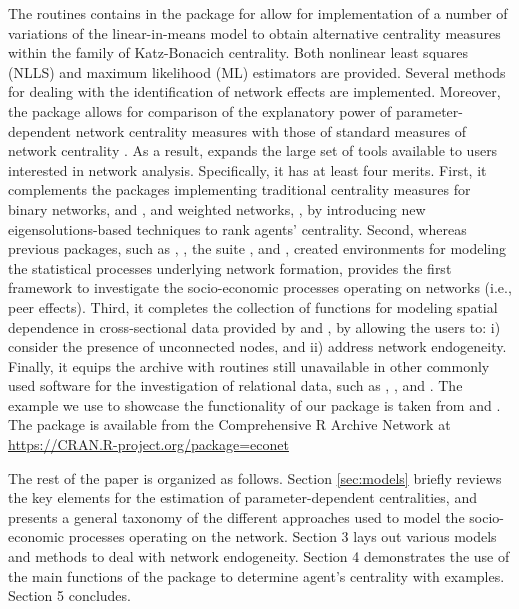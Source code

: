 \documentclass[nojss]{jss}
\begin{document}
	The routines contains in the package  for  \citep{R} allow for implementation of a number of variations of the linear-in-means model to obtain alternative centrality measures within the family of Katz-Bonacich centrality. Both nonlinear least squares (NLLS) and maximum likelihood (ML) estimators are provided. Several methods for dealing with the identification of network effects are implemented. Moreover, the  package allows for comparison of the explanatory power of parameter-dependent network centrality measures with those of standard measures of network centrality \citep{Wasserman+Faust:1994}. As a result,  expands the large set of tools available to  users interested in network analysis. Specifically, it has at least four merits. First, it complements the  packages implementing traditional centrality measures for binary networks,  \citep{igraph} and  \citep{sna}, and weighted networks,  \citep{tnet}, by introducing new eigensolutions-based techniques to rank agents' centrality. Second, whereas previous packages, such as  \citep{btergm},  \citep{hergm}, the  suite \citep{statnet}, and  \citep{xergm}, created environments for modeling the statistical processes underlying network formation,  provides the first framework to investigate the socio-economic processes operating on networks (i.e., peer effects). Third, it completes the collection of functions for modeling spatial dependence in cross-sectional data provided by  \citep{spdep} and  \citep{splm}, by allowing the users to: i) consider the presence of unconnected nodes, and ii) address network endogeneity. Finally, it equips the  archive with routines still unavailable in other commonly used software for the investigation of relational data, such as  \citep{MATLAB},  \citep{Batagelj:2003},  \citep{Python} and  \citep{Stata}. The example we use to showcase the functionality of our  package is taken from \cite{Battaglini+Patacchini:2018} and \cite{Battaglini+Sciabolazza+Patacchini:2018}. The  package  is available from the Comprehensive R Archive Network at \url{https://CRAN.R-project.org/package=econet} 
	
	The rest of the paper is organized as follows. Section \ref{sec:models} briefly reviews the key elements for the estimation of parameter-dependent centralities, and presents a general taxonomy of the different approaches used to model the socio-economic processes operating on the network. Section 3 lays out various models and methods to deal with network endogeneity. Section 4 demonstrates the use of the main functions of the package  to determine agent's centrality with examples. Section 5 concludes.
	
\end{document}
